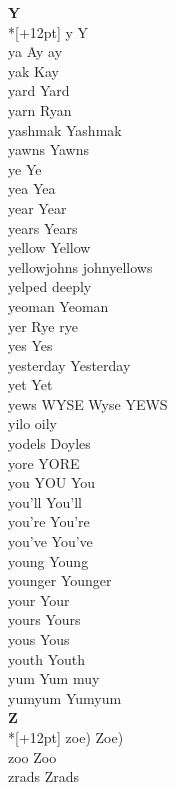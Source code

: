 \vspace{14pt}
\noindent\textbf{\Large Y}\\*[+12pt]
y Y\\
ya Ay ay\\
yak Kay\\
yard Yard\\
yarn Ryan\\
yashmak Yashmak\\
yawns Yawns\\
ye Ye\\
yea Yea\\
year Year\\
years Years\\
yellow Yellow\\
yellowjohns johnyellows\\
yelped deeply\\
yeoman Yeoman\\
yer Rye rye\\
yes Yes\\
yesterday Yesterday\\
yet Yet\\
yews WYSE Wyse YEWS\\
yilo oily\\
yodels Doyles\\
yore YORE\\
you YOU You\\
you'll You'll\\
you're You're\\
you've You've\\
young Young\\
younger Younger\\
your Your\\
yours Yours\\
yous Yous\\
youth Youth\\
yum Yum muy\\
yumyum Yumyum\\

\vspace{14pt}
\noindent\textbf{\Large Z}\\*[+12pt]
zoe) Zoe)\\
zoo Zoo\\
zrads Zrads\\
